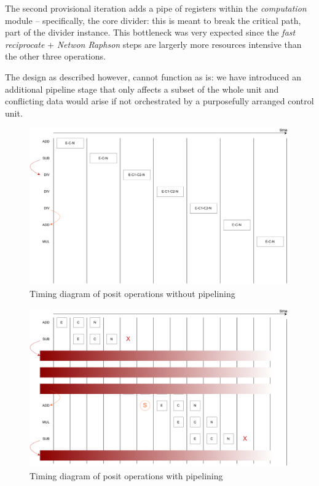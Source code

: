The second provisional iteration adds a pipe of registers within the \textit{computation} module -- specifically, the core divider: this is meant to break the critical path, part of the divider instance. This bottleneck was very expected since the \textit{fast reciprocate} + \textit{Netwon Raphson} steps are largerly more resources intensive than the other three operations.

The design as described however, cannot function as is: we have introduced an additional pipeline stage that only affects a subset of the whole unit and conflicting data would arise if not orchestrated by a purposefully arranged control unit.



\begin{figure}
    \centering
    \includegraphics[width=\textwidth]{figures/pipeline_ops_diagram1.pdf}
    \caption{Timing diagram of posit operations without pipelining}
    \label{fig:timing_diagram_4_stagesdiv_3stagesothers_without_pipelining}
\end{figure}
\begin{figure}
    \centering
    \includegraphics[width=\textwidth]{figures/pipeline_ops_diagram2.pdf}
    \caption{Timing diagram of posit operations with pipelining}
    \label{fig:timing_diagram_4_stagesdiv_3stagesothers_with_pipelining}
\end{figure}



